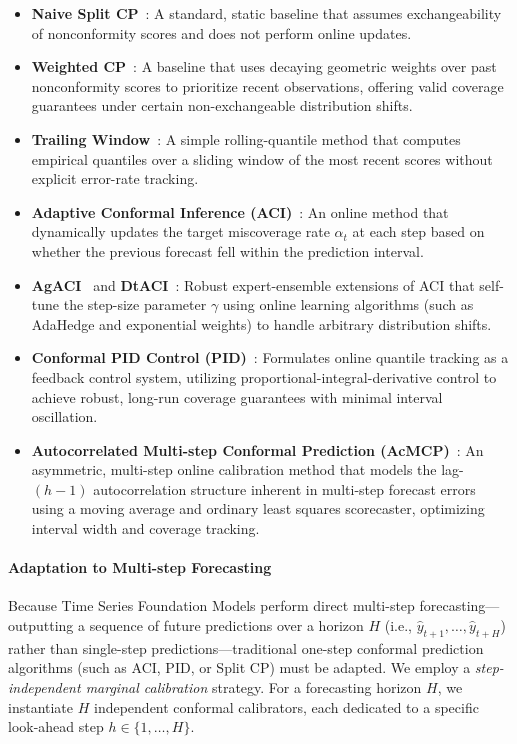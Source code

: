 \documentclass[12pt, a4paper]{article}
\begin{document}
\begin{itemize}
	\item \textbf{Naive Split CP}~\cite{papadopoulos2002, vovk2005algorithmic}: A standard, static baseline that assumes exchangeability of nonconformity scores and does not perform online updates.
	\item \textbf{Weighted CP}~\cite{weighted-cp}: A baseline that uses decaying geometric weights over past nonconformity scores to prioritize recent observations, offering valid coverage guarantees under certain non-exchangeable distribution shifts.
	\item \textbf{Trailing Window}~\cite{dss}: A simple rolling-quantile method that computes empirical quantiles over a sliding window of the most recent scores without explicit error-rate tracking.
	\item \textbf{Adaptive Conformal Inference (ACI)}~\cite{aci}: An online method that dynamically updates the target miscoverage rate \(\alpha_t\) at each step based on whether the previous forecast fell within the prediction interval.
	\item \textbf{AgACI}~\cite{agaci} and \textbf{DtACI}~\cite{dtaci}: Robust expert-ensemble extensions of ACI that self-tune the step-size parameter \(\gamma\) using online learning algorithms (such as AdaHedge and exponential weights) to handle arbitrary distribution shifts.
	\item \textbf{Conformal PID Control (PID)}~\cite{c-pid}: Formulates online quantile tracking as a feedback control system, utilizing proportional-integral-derivative control to achieve robust, long-run coverage guarantees with minimal interval oscillation.
	\item \textbf{Autocorrelated Multi-step Conformal Prediction (AcMCP)}~\cite{acmcp}: An asymmetric, multi-step online calibration method that models the lag-\((h-1)\) autocorrelation structure inherent in multi-step forecast errors using a moving average and ordinary least squares scorecaster, optimizing interval width and coverage tracking.
\end{itemize}

\paragraph{Adaptation to Multi-step Forecasting}
Because Time Series Foundation Models perform direct multi-step forecasting---outputting a sequence of future predictions over a horizon \(H\) (i.e., \(\hat{y}_{t+1}, \dots, \hat{y}_{t+H}\)) rather than single-step predictions---traditional one-step conformal prediction algorithms (such as ACI, PID, or Split CP) must be adapted. We employ a \textit{step-independent marginal calibration} strategy. For a forecasting horizon \(H\), we instantiate \(H\) independent conformal calibrators, each dedicated to a specific look-ahead step \(h \in \{1, \dots, H\}\).
\end{document}
